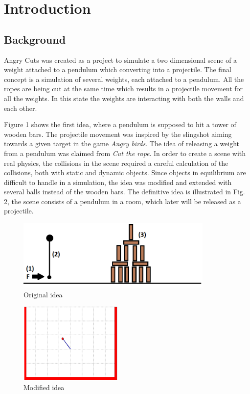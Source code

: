 \documentclass[a4paper,12pt,twoside,english]{article}
\begin{document}
\pagestyle{plain}


\setcounter{page}{1}
\section{Introduction}
\subsection{Background}
Angry Cuts was created as a project to simulate a two dimensional scene of a weight attached to a pendulum which converting into a projectile. 
The final concept is a simulation of several weights, each attached to a pendulum. All the ropes are being cut at the same time which results in a projectile movement for all the weights. In this state the weights are interacting with both the walls and each other.

Figure 1 shows the first idea, where a pendulum is supposed to hit a tower of wooden bars. The projectile movement was inspired by the slingshot aiming towards a given target in the game {\itshape Angry birds}. The idea of releasing a weight from a pendulum was claimed from {\itshape Cut the rope}. In order to create a scene with real physics, the collisions in the scene required a careful calculation of the collisions, both with static and dynamic objects. Since objects in equilibrium are difficult to handle in a simulation, the idea was modified and extended with several balls instead of the wooden bars. The definitive idea is illustrated in Fig. 2, the scene consists of a pendulum in a room, which later will be released as a projectile.


\begin{figure}[h]
\includegraphics[height=3.5cm]{bilder/ideasketch.png}
\centering
\caption{Original idea}
\end{figure}
\begin{figure}[h]
\includegraphics[height=4cm]{bilder/Matlab_Pendulum1.png}
\centering
\caption{Modified idea}
\end{figure} 
\end{document}
